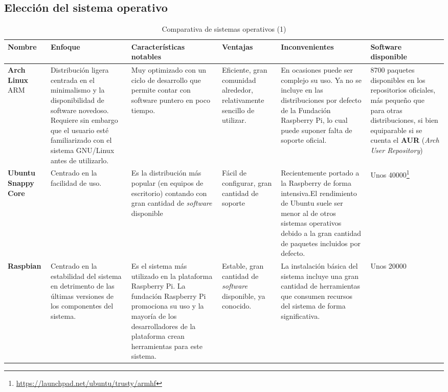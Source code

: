 \begin{landscape}
\subsection{Elección del sistema operativo}
\label{os:evaluation}
\begin{table}[h]
\begin{tabular}{|p{1.6cm}|p{5cm}|p{4cm}|p{3cm}|p{4cm}|p{4cm}|}
\hline
\textbf{Nombre} & \textbf{Enfoque} & \textbf{Características notables} & \textbf{Ventajas} & \textbf{Inconvenientes} & \textbf{Software disponible}\\ \hline
\textbf{Arch Linux} ARM & Distribución ligera centrada en el minimalismo y la disponibilidad de software novedoso. Requiere sin embargo que el usuario esté familiarizado con el sistema GNU/Linux antes de utilizarlo. & Muy optimizado con un ciclo de desarrollo que permite contar con software puntero en poco tiempo. & Eficiente, gran comunidad alrededor, relativamente sencillo de utilizar. & En ocasiones puede ser complejo su uso. Ya no se incluye en las distribuciones por defecto de la Fundación Raspberry Pi, lo cual puede suponer falta de soporte oficial. & 8700 paquetes disponibles en los repositorios oficiales, más pequeño que para otras distribuciones, si bien equiparable si se cuenta el \textbf{AUR} (\textit{Arch User Repository})\\ \hline

\textbf{Ubuntu Snappy Core} & Centrado en la facilidad de uso. & Es la distribución más popular (en equipos de escritorio) contando con gran cantidad de \textit{software} disponible & Fácil de configurar, gran cantidad de soporte & Recientemente portado a la Raspberry de forma intensiva.El rendimiento de Ubuntu suele ser menor al de otros sistemas operativos debido a la gran cantidad de paquetes incluidos por defecto. & Unos 40000\footnote{\href{https://launchpad.net/ubuntu/trusty/armhf}{https://launchpad.net/ubuntu/trusty/armhf}}\\ \hline 

\textbf{Raspbian} & Centrado en la estabilidad del sistema en detrimento de las últimas versiones de los componentes del sistema. & Es el sistema más utilizado en la plataforma Raspberry Pi. La fundación Raspberry Pi promociona su uso y la mayoría de los desarrolladores de la plataforma crean herramientas para este sistema. & Estable, gran cantidad de \textit{software} disponible, ya conocido. & La instalación básica del sistema incluye una gran cantidad de herramientas que consumen recursos del sistema de forma significativa. & Unos 20000\\ \hline
\end{tabular}
\caption{Comparativa de sistemas operativos (1)}
\end{table}
\end{landscape}

